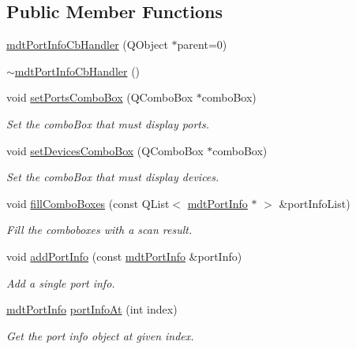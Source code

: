 \subsection*{Public Member Functions}
\begin{DoxyCompactItemize}
\item 
\hyperlink{classmdt_port_info_cb_handler_a1495b2c7f83722aaef8b244604284b51}{mdt\-Port\-Info\-Cb\-Handler} (Q\-Object $\ast$parent=0)
\item 
\hyperlink{classmdt_port_info_cb_handler_aea23badb55366480f7a7d1ffeff2b85a}{$\sim$mdt\-Port\-Info\-Cb\-Handler} ()
\item 
void \hyperlink{classmdt_port_info_cb_handler_a06f9b5e8127e61026911691827f3203a}{set\-Ports\-Combo\-Box} (Q\-Combo\-Box $\ast$combo\-Box)
\begin{DoxyCompactList}\small\item\em Set the combo\-Box that must display ports. \end{DoxyCompactList}\item 
void \hyperlink{classmdt_port_info_cb_handler_a59fc2180a69119e17cfa24cf84a9c96f}{set\-Devices\-Combo\-Box} (Q\-Combo\-Box $\ast$combo\-Box)
\begin{DoxyCompactList}\small\item\em Set the combo\-Box that must display devices. \end{DoxyCompactList}\item 
void \hyperlink{classmdt_port_info_cb_handler_a82c84a3eb52cd5d941377a64788a28ef}{fill\-Combo\-Boxes} (const Q\-List$<$ \hyperlink{classmdt_port_info}{mdt\-Port\-Info} $\ast$ $>$ \&port\-Info\-List)
\begin{DoxyCompactList}\small\item\em Fill the comboboxes with a scan result. \end{DoxyCompactList}\item 
void \hyperlink{classmdt_port_info_cb_handler_ae84e252c9783c204583639212a04aa12}{add\-Port\-Info} (const \hyperlink{classmdt_port_info}{mdt\-Port\-Info} \&port\-Info)
\begin{DoxyCompactList}\small\item\em Add a single port info. \end{DoxyCompactList}\item 
\hyperlink{classmdt_port_info}{mdt\-Port\-Info} \hyperlink{classmdt_port_info_cb_handler_a92a284d227c4f0ce42df9890a9185a97}{port\-Info\-At} (int index)
\begin{DoxyCompactList}\small\item\em Get the port info object at given index. \end{DoxyCompactList}\item 

\end{DoxyCompactItemize}
